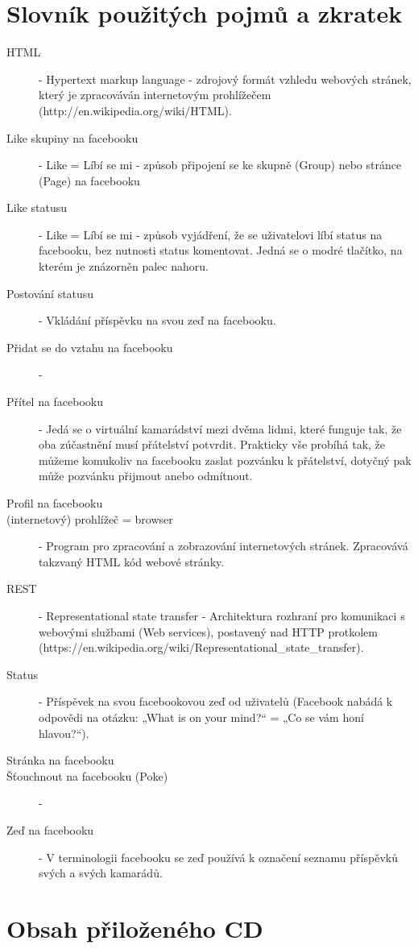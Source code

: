 \documentclass[thesis=M,czech]{FITthesis}[2013/05/10]
\begin{document}
\chapter{Slovník použitých pojmů a zkratek}
\begin{description}
	\item[HTML] - Hypertext markup language - zdrojový formát vzhledu webových stránek, který je zpracováván internetovým prohlížečem
		\newline(http://en.wikipedia.org/wiki/HTML).
	\item[Like skupiny na facebooku] - Like = Líbí se mi - způsob připojení se ke skupně (Group) nebo stránce (Page) na facebooku
	\item[Like statusu] - Like = Líbí se mi - způsob vyjádření, že se uživatelovi líbí status na facebooku, bez nutnosti status komentovat. Jedná se o modré tlačítko, na kterém je znázorněn palec nahoru.
	\item[Postování statusu] - Vkládání příspěvku na svou zeď na  facebooku.
	\item[Přidat se do vztahu na facebooku] - 
	\item[Přítel na facebooku] - Jedá se o virtuální kamarádství mezi dvěma lidmi, které funguje tak, že oba zúčastnění musí přátelství potvrdit. Prakticky vše probíhá tak, že můžeme komukoliv na facebooku zaslat pozvánku k přátelství, dotyčný pak může pozvánku přijmout anebo odmítnout.  
	\item[Profil na facebooku]
	\item[(internetový) prohlížeč = browser] - Program pro zpracování a zobrazování internetových stránek. Zpracovává takzvaný HTML kód webové stránky.
	\item[REST] - Representational state transfer - Architektura rozhraní pro komunikaci s webovými službami (Web services), postavený nad HTTP protkolem
\newline(https://en.wikipedia.org/wiki/Representational\_state\_transfer).
	\item[Status] - Příspěvek na svou facebookovou zeď od uživatelů (Facebook nabádá k odpovědi na otázku: „What is on your mind?“ = „Co se vám honí hlavou?“).
	\item[Stránka na facebooku]
	\item[Šťouchnout na facebooku (Poke)] -
	\item[Zeď na facebooku] - V terminologii facebooku se zeď používá k označení seznamu příspěvků svých a svých kamarádů.
\end{description}

\chapter{Obsah přiloženého CD}

\begin{figure}
\end{figure}
\end{document}
